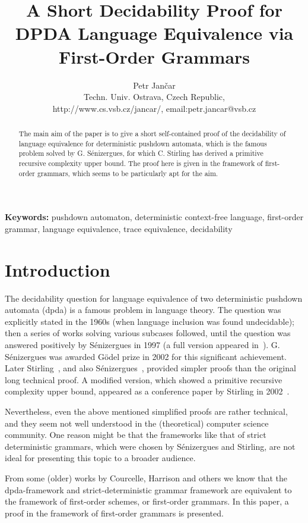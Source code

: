 \documentclass[12pt]{article}
\title{A Short Decidability Proof for DPDA Language Equivalence 
via First-Order Grammars
}
\author{Petr Jan\v{c}ar\\
{\small Techn. Univ. Ostrava, Czech Republic,}\\
{\small http://www.cs.vsb.cz/jancar/,
 email:petr.jancar@vsb.cz}
}
\date{}
\begin{document}
\maketitle


\begin{abstract}
\noindent
The main aim of the paper is to give a short 
self-contained proof of the decidability of
language equivalence for deterministic pushdown automata, 
which is the famous problem 
solved by G. S\'enizergues, for which  C. Stirling has 
derived a primitive recursive complexity upper bound.
The proof here is given in 
the framework of first-order grammars,
which seems to be particularly apt for the aim.
\end{abstract}

\noindent
\textbf{Keywords:} pushdown automaton, deterministic context-free
language, first-order grammar, language equivalence, trace
equivalence,
decidability 



\section{Introduction}
\label{sec:intro}


The decidability question for language equivalence of two
deterministic pushdown automata (dpda) is  a famous problem in language
theory. The question was explicitly stated in the 1960s 
\cite{Ginsburg66} (when language inclusion was found undecidable);
then a series of works solving various subcases followed,
until the question was answered positively
by S\'enizergues in 1997 
(a full version appeared in~\cite{Senizergues:TCS2001}).
G. S\'enizergues was
awarded G\"odel prize in 2002 for this significant achievement. 
Later Stirling~\cite{Stirling:TCS2001},
and also S\'enizergues~\cite{Senizergues:TCS2001_simple},
provided simpler proofs than the original long
technical proof. A modified version, which 
showed a primitive recursive complexity upper bound, appeared as a conference
paper by Stirling in 2002~\cite{Stir:DPDA:prim}.  


Nevertheless, even the above mentioned simplified proofs are rather
technical, and they seem not well understood in the (theoretical)
computer science community.
One reason might be that the frameworks like that of strict deterministic
grammars, which were chosen by S\'enizergues and Stirling, are not
ideal for presenting this topic to a broader audience. 

From some (older) works by Courcelle,
Harrison and others we know that the dpda-framework
and strict-deterministic grammar framework are equivalent 
 to the
framework of first-order schemes, or first-order grammars. 
In this paper, a proof in the framework of first-order grammars is
presented.
\end{document}
